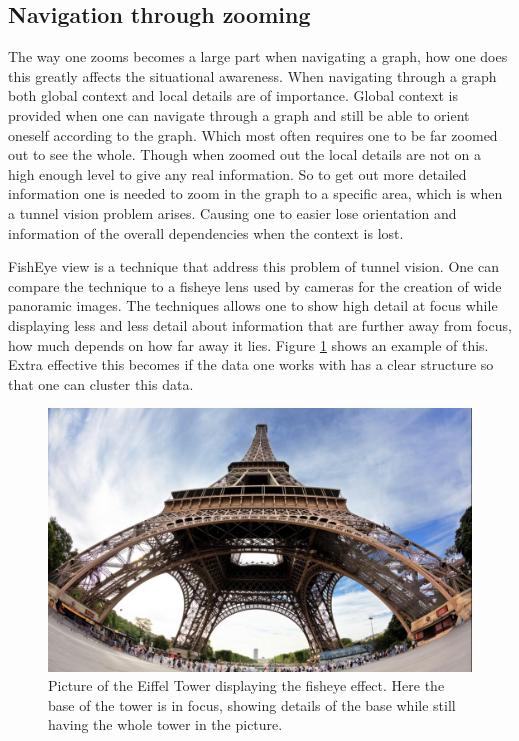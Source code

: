 \documentclass[a4paper,11pt]{kth-mag}
\begin{document}
\subsection{Navigation through zooming}
The way one zooms becomes a large part when navigating a graph, how one does this greatly affects the situational awareness. When navigating through a graph both global context and local details are of importance. Global context
is provided when one can navigate through a graph and still be able to orient oneself according to the graph. Which most often requires one to be far zoomed out to see the whole. Though when zoomed out the local details are not 
on a high enough level to give any real information. So to get out more detailed information one is needed to zoom in the graph to a specific area, which is when a tunnel vision problem arises. 
Causing one to easier lose orientation and information of the overall dependencies when the context is lost.

FishEye view is a technique that address this problem of tunnel vision. One can compare the technique to a fisheye lens used by cameras for the creation of wide panoramic images. The techniques allows one to show high detail
at focus while displaying less and less detail about information that are further away from focus, how much depends on how far away it lies. Figure \ref{fig:FishEye} shows an example of this. Extra effective this becomes if the data one works with has a clear structure so
that one can cluster this data.

\begin{figure}[!htbp]
	\centering
	\includegraphics[scale=0.3]{FishEyeEiffel}
	\caption{Picture of the Eiffel Tower displaying the fisheye effect. Here the base of the tower is in focus, showing details of the base while still having the whole tower in the picture.}
	\label{fig:FishEye}
\end{figure}
\end{document}
